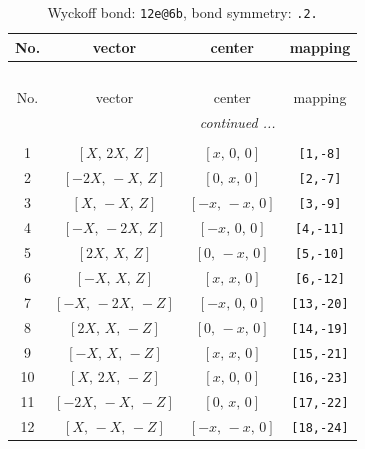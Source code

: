 \documentclass[fleqn,8pt]{jsarticle}
\begin{document}
\begin{longtable}{cccc}
\caption{Wyckoff bond: {\tt 12e@6b}, bond symmetry: {\tt .2.}}
 \\
 \hline \hline
No. & vector & center & mapping \\ \hline \endfirsthead

\multicolumn{3}{l}{\tablename\ \thetable{}} \\
 \hline \hline
No. & vector & center & mapping \\ \hline \endhead

 \hline \hline
\multicolumn{3}{r}{\footnotesize\it continued ...} \\ \endfoot

 \hline \hline
\multicolumn{3}{r}{} \\ \endlastfoot

1 & $\left[ X,\, 2 X,\, Z \right]$ & $\left[ x,\, 0,\, 0 \right]$ & {\tt [1,-8]} \\ \hline
2 & $\left[ - 2 X,\, - X,\, Z \right]$ & $\left[ 0,\, x,\, 0 \right]$ & {\tt [2,-7]} \\ \hline
3 & $\left[ X,\, - X,\, Z \right]$ & $\left[ - x,\, - x,\, 0 \right]$ & {\tt [3,-9]} \\ \hline
4 & $\left[ - X,\, - 2 X,\, Z \right]$ & $\left[ - x,\, 0,\, 0 \right]$ & {\tt [4,-11]} \\ \hline
5 & $\left[ 2 X,\, X,\, Z \right]$ & $\left[ 0,\, - x,\, 0 \right]$ & {\tt [5,-10]} \\ \hline
6 & $\left[ - X,\, X,\, Z \right]$ & $\left[ x,\, x,\, 0 \right]$ & {\tt [6,-12]} \\ \hline
7 & $\left[ - X,\, - 2 X,\, - Z \right]$ & $\left[ - x,\, 0,\, 0 \right]$ & {\tt [13,-20]} \\ \hline
8 & $\left[ 2 X,\, X,\, - Z \right]$ & $\left[ 0,\, - x,\, 0 \right]$ & {\tt [14,-19]} \\ \hline
9 & $\left[ - X,\, X,\, - Z \right]$ & $\left[ x,\, x,\, 0 \right]$ & {\tt [15,-21]} \\ \hline
10 & $\left[ X,\, 2 X,\, - Z \right]$ & $\left[ x,\, 0,\, 0 \right]$ & {\tt [16,-23]} \\ \hline
11 & $\left[ - 2 X,\, - X,\, - Z \right]$ & $\left[ 0,\, x,\, 0 \right]$ & {\tt [17,-22]} \\ \hline
12 & $\left[ X,\, - X,\, - Z \right]$ & $\left[ - x,\, - x,\, 0 \right]$ & {\tt [18,-24]} \\
\end{longtable}
\renewcommand{\arraystretch}{1.2}
\end{document}
